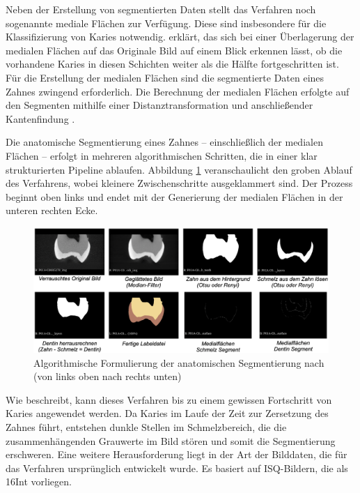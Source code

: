 Neben der Erstellung von segmentierten Daten stellt das Verfahren noch
sogenannte mediale Flächen zur Verfügung. Diese sind insbesondere für die Klassifizierung
von Karies notwendig. \citet[S.~42]{hoffmann2020} erklärt, das sich bei einer
Überlagerung der medialen Flächen auf das Originale Bild auf einem Blick
erkennen lässt, ob die vorhandene Karies in diesen Schichten weiter als die Hälfte
fortgeschritten ist. Für die Erstellung der medialen Flächen sind die
segmentierte Daten eines Zahnes zwingend erforderlich. Die Berechnung der medialen
Flächen erfolgte auf den Segmenten mithilfe einer Distanztransformation und anschließender
Kantenfindung \citep[vgl.][S.~42]{hoffmann2020}.

Die anatomische Segmentierung eines Zahnes – einschließlich der medialen Flächen
– erfolgt in mehreren algorithmischen Schritten, die in einer klar strukturierten
Pipeline ablaufen. Abbildung \ref{fig:anatomische_segmentierung} veranschaulicht
den groben Ablauf des Verfahrens, wobei kleinere Zwischenschritte ausgeklammert sind.
Der Prozess beginnt oben links und endet mit der Generierung der medialen
Flächen in der unteren rechten Ecke.

\begin{figure}[h]
	\centering
	\includegraphics[width=1\textwidth]{img/anatomischeSegmentierung.png}
	\caption{Algorithmische Formulierung der anatomischen Segmentierung nach
	\citet{hoffmann2020} (von links oben nach rechts unten)}
	\label{fig:anatomische_segmentierung}
\end{figure}

Wie \citet[S.~55]{hoffmann2020} beschreibt, kann dieses Verfahren bis zu einem gewissen
Fortschritt von Karies angewendet werden. Da Karies im Laufe der Zeit zur
Zersetzung des Zahnes führt, entstehen dunkle Stellen im Schmelzbereich, die die
zusammenhängenden Grauwerte im Bild stören und somit die Segmentierung
erschweren. Eine weitere Herausforderung liegt in der Art der Bilddaten, die für
das Verfahren ursprünglich entwickelt wurde. Es basiert auf \ac{ISQ}-Bildern, die
als \ac{16Int} vorliegen.


